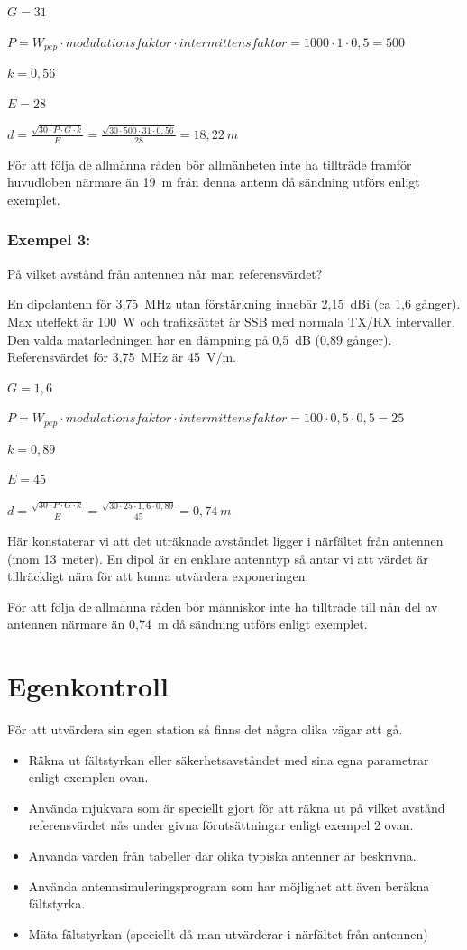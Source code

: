 \(G = 31\)

\(P = W_{pep} \cdot modulationsfaktor \cdot intermittensfaktor
= 1000 \cdot 1 \cdot 0,5 = 500\)

\(k = 0,56\)

\(E = 28\)

\(d = \frac{\sqrt{30 \cdot P \cdot G \cdot k}}{E}
= \frac{\sqrt{30 \cdot 500 \cdot 31 \cdot 0,56}}{28}
= 18,22\ m\)

För att följa de allmänna råden bör allmänheten inte ha tillträde framför
huvudloben närmare än 19~m från denna antenn då sändning utförs
enligt exemplet.

\subsubsection{Exempel 3:}

På vilket avstånd från antennen når man referensvärdet?

En dipolantenn för 3,75~MHz utan förstärkning innebär 2,15~dBi (ca 1,6 gånger).
Max uteffekt är 100~W och trafiksättet är SSB med normala TX/RX intervaller.
Den valda matarledningen har en dämpning på 0,5~dB (0,89 gånger).
Referensvärdet för 3,75~MHz är 45~V/m.

\(G = 1,6\)

\(P = W_{pep} \cdot modulationsfaktor \cdot intermittensfaktor
= 100 \cdot 0,5 \cdot 0,5 = 25\)

\(k = 0,89\)

\(E = 45\)

\(d = \frac{\sqrt{30 \cdot P \cdot G \cdot k}}{E} = \frac{\sqrt{30 \cdot 25 \cdot 1,6 \cdot 0,89}}{45}
= 0,74\ m\)

Här konstaterar vi att det uträknade avståndet ligger i närfältet från
antennen (inom 13~meter). En dipol är en enklare antenntyp så antar vi
att värdet är tillräckligt nära för att kunna utvärdera exponeringen.

För att följa de allmänna råden bör människor inte ha tillträde till
nån del av antennen närmare än 0,74~m då sändning utförs enligt exemplet.

\section{Egenkontroll}

För att utvärdera sin egen station så finns det några olika vägar att gå.

\begin{itemize}
\item Räkna ut fältstyrkan eller säkerhetsavståndet med sina egna
parametrar enligt exemplen ovan.
\item Använda mjukvara som är speciellt gjort för att räkna ut på
vilket avstånd referensvärdet nås under givna förutsättningar enligt
exempel 2 ovan.
\item Använda värden från tabeller där olika typiska antenner är beskrivna.
\item Använda antennsimuleringsprogram som har möjlighet att även
beräkna fältstyrka.
\item Mäta fältstyrkan (speciellt då man utvärderar i närfältet från antennen)
\end{itemize}

